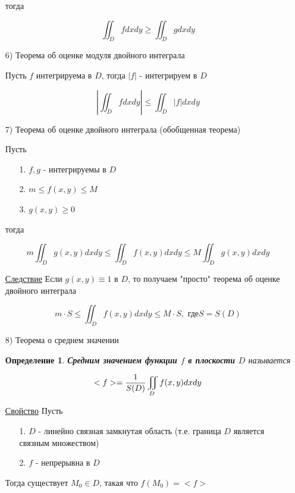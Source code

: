 \documentclass[a4paper, 14pt]{report}
\newtheorem{defenition}{Определение}[section]
\begin{document}
\begin{enumerate}
    тогда
    
    $$ \iint_D f dxdy \geq \iint_D g dxdy $$
    
    \item[6)] Теорема об оценке модуля двойного интеграла
    
    Пусть $f$ интегрируема в $D$, тогда $|f|$ - интегрируем в $D$
    
    $$ |\iint_D f dxdy| \le \iint_D |f| dxdy $$
    
    \item[7)] Теорема об оценке двойного интеграла (обобщенная теорема)
    
    Пусть 
    
    \begin{enumerate}
        \item[1.] $f,g$ - интегрируемы в $D$
        \item[2.] $m \le f(x,y) \le M$
        \item[3.] $g(x,y) \geq 0$
    \end{enumerate}
    
    тогда
    
    $$ m \iint_D g(x,y) dxdy \le \iint_D f(x,y) dxdy \le M \iint_D g(x,y) dxdy $$
    
    \underline{Следствие} Если $g(x,y) \equiv 1$ в $D$, то получаем "просто" теорема об оценке двойного интеграла
    
    $$ m \cdot S \le \iint_D f(x,y) dxdy \le M \cdot S, \text{ где} S = S(D)$$
    
    
    \item[8)] Теорема о среднем значении
    
        \begin{defenition}
            \textbf{Средним значением функции $f$ в плоскости $D$} называется
        \end{defenition}
    
    $$ <f> = {1 \over S(D)} \iint_D f(x,y) dxdy $$
    
    \underline{Свойство} Пусть 
    
    \begin{enumerate}
        \item[1.] $D$ - линейно связная замкнутая область (т.е. граница $D$ является связным множеством)
        \item[2.] $f$ - непрерывна в $D$
    \end{enumerate}
    
    Тогда существует $M_0 \in D$, такая что $f(M_0) = <f>$
    

\end{enumerate}
\end{document}
